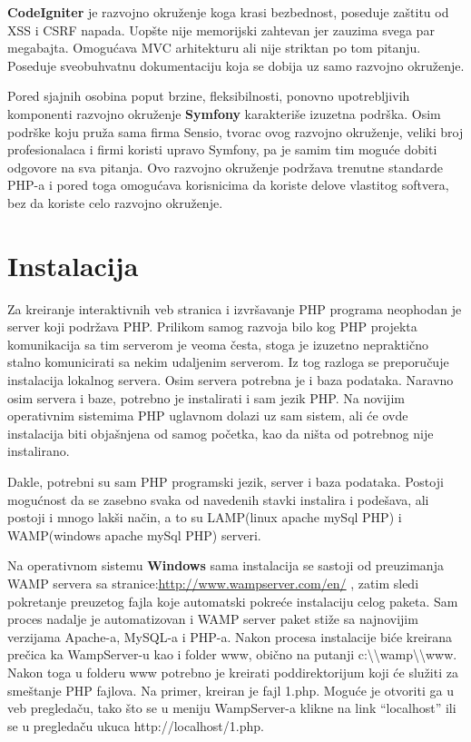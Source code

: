 \documentclass[a4paper]{article}
\begin{document}
{\textbf{CodeIgniter} je razvojno okruženje koga krasi bezbednost, poseduje zaštitu od XSS i CSRF napada. Uopšte nije memorijski zahtevan jer zauzima svega par megabajta. Omogućava MVC arhitekturu ali nije striktan po tom pitanju. Poseduje sveobuhvatnu dokumentaciju koja se dobija uz samo razvojno okruženje.

Pored sjajnih osobina poput brzine, fleksibilnosti, ponovno upotrebljivih komponenti razvojno okruženje \textbf{Symfony} karakteriše izuzetna podrška. Osim podrške koju pruža sama firma Sensio, tvorac ovog razvojno okruženje, veliki broj profesionalaca i firmi koristi upravo Symfony, pa je samim tim moguće dobiti odgovore na sva pitanja. Ovo razvojno okruženje podržava trenutne standarde PHP-a i pored toga omogućava korisnicima da koriste delove vlastitog softvera, bez da koriste celo razvojno okruženje.

\section{Instalacija}
Za kreiranje interaktivnih veb stranica i izvršavanje PHP programa neophodan je server koji podržava PHP. Prilikom samog razvoja bilo kog PHP projekta komunikacija sa tim serverom je veoma česta, stoga je izuzetno nepraktično stalno komunicirati sa nekim udaljenim serverom. Iz tog razloga se preporučuje instalacija lokalnog servera. Osim servera potrebna je i baza podataka. Naravno osim servera i baze, potrebno je instalirati i sam jezik PHP. Na novijim operativnim sistemima PHP uglavnom dolazi uz sam sistem, ali će ovde instalacija biti objašnjena od samog početka, kao da ništa od potrebnog nije instalirano.

Dakle, potrebni su sam PHP programski jezik, server i baza podataka. Postoji mogućnost da se zasebno svaka od navedenih stavki instalira i podešava, ali postoji i mnogo lakši način, a to su LAMP(linux apache mySql PHP) \cite{lamp} i WAMP(windows apache mySql PHP) \cite{wamp} serveri. 

Na operativnom sistemu \textbf{Windows} sama instalacija se sastoji od preuzimanja WAMP servera sa stranice:\url{http://www.wampserver.com/en/} , zatim sledi pokretanje preuzetog fajla koje automatski pokreće instalaciju celog paketa. Sam proces nadalje je automatizovan i WAMP server paket stiže sa najnovijim verzijama Apache-a, MySQL-a i PHP-a. Nakon procesa instalacije biće kreirana prečica ka WampServer-u kao i  folder www, obično na putanji c:\textbackslash \textbackslash wamp\textbackslash \textbackslash www. Nakon toga u folderu www potrebno je kreirati poddirektorijum koji će služiti za smeštanje PHP fajlova. Na primer, kreiran je fajl 1.php. Moguće je otvoriti ga u veb pregledaču, tako što se u meniju WampServer-a klikne na link “localhost” ili se u pregledaču ukuca http://localhost/1.php.

}
\end{document}
